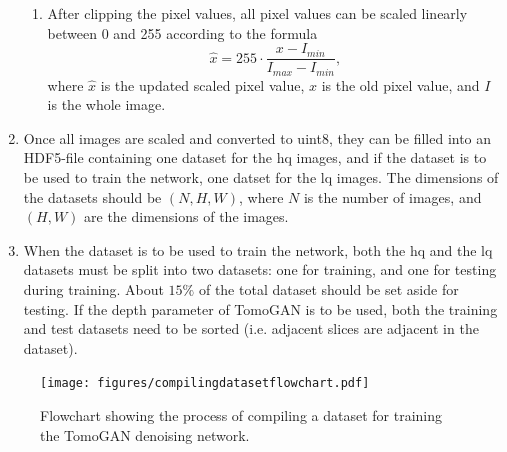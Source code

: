\begin{enumerate}
\begin{enumerate}
        \item After clipping the pixel values, all pixel values can be scaled linearly between 0 and 255 according to the formula 
        \begin{equation}
            \label{eq:scaleimages}
            \hat{x} = 255 \cdot \frac{x - I_{min}}{I_{max} - I_{min}},
        \end{equation}
        where $\hat{x}$ is the updated scaled pixel value, $x$ is the old pixel value, and $I$ is the whole image.
    \end{enumerate}
    \item Once all images are scaled and converted to uint8, they can be filled into an HDF5-file containing one dataset for the \gls{hq} images, and if the dataset is to be used to train the network, one datset for the \gls{lq} images. The dimensions of the datasets should be $(N,H,W)$, where $N$ is the number of images, and $(H,W)$ are the dimensions of the images. 
    \item When the dataset is to be used to train the network, both the \gls{hq} and the \gls{lq} datasets must be split into two datasets: one for training, and one for testing during training. About $15\%$ of the total dataset should be set aside for testing. If the depth parameter of TomoGAN is to be used, both the training and test datasets need to be sorted (i.e. adjacent slices are adjacent in the dataset). 
\end{enumerate}


\begin{figure}[htbp]  
    \centering
    \texttt{[image: figures/compilingdatasetflowchart.pdf]}
    \caption[Dataset creation flowchart]{Flowchart showing the process of compiling a dataset for training the TomoGAN denoising network. }
    \label{fig:compilingdatasetflowchart}
\end{figure}
